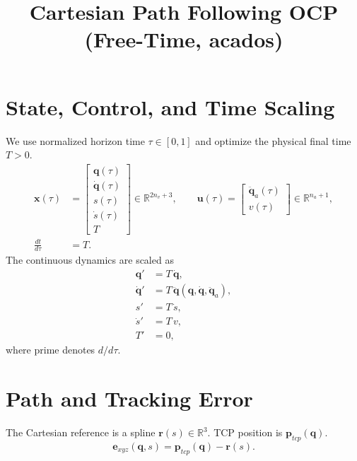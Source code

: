 \documentclass[11pt,a4paper]{article}
\title{Cartesian Path Following OCP (Free-Time, acados)}
\author{}
\date{}
\newcommand{\R}{\mathbb{R}}
\newcommand{\q}{\bm{q}}
\newcommand{\dq}{\dot{\bm{q}}}
\newcommand{\ddq}{\ddot{\bm{q}}}
\begin{document}
\maketitle

\section*{State, Control, and Time Scaling}
We use normalized horizon time $\tau\in[0,1]$ and optimize the physical final time $T>0$.
\begin{align}
\bm{x}(\tau) &= \begin{bmatrix}\q(\tau)\\ \dq(\tau)\\ s(\tau)\\ \dot s(\tau)\\ T\end{bmatrix}\in\R^{2n_v+3},
\qquad
\bm{u}(\tau)=\begin{bmatrix}\ddq_a(\tau)\\ v(\tau)\end{bmatrix}\in\R^{n_a+1},
\\
\frac{dt}{d\tau} &= T.
\end{align}
The continuous dynamics are scaled as
\begin{align}
\q' &= T\,\dq, \\
\dq' &= T\,\ddq(\q,\dq,\ddq_a), \\
 s' &= T\,\dot s, \\
 \dot s' &= T\,v, \\
 T' &= 0,
\end{align}
where prime denotes $d/d\tau$.

\section*{Path and Tracking Error}
The Cartesian reference is a spline $\bm{r}(s)\in\R^3$. TCP position is $\bm{p}_{tcp}(\q)$.
\begin{equation}
\bm{e}_{xyz}(\q,s)=\bm{p}_{tcp}(\q)-\bm{r}(s).
\end{equation}
\end{document}
